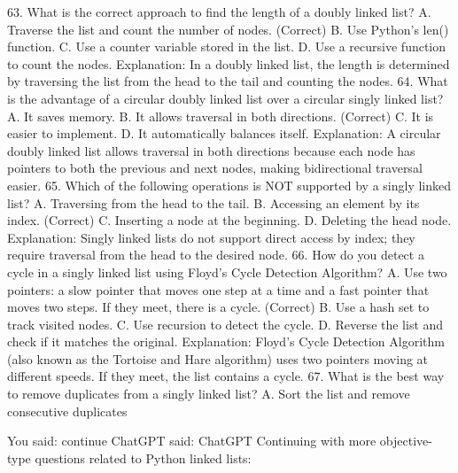 63. What is the correct approach to find the length of a doubly linked list?
A. Traverse the list and count the number of nodes. (Correct)
B. Use Python’s len() function.
C. Use a counter variable stored in the list.
D. Use a recursive function to count the nodes.
Explanation: In a doubly linked list, the length is determined by traversing the list from the head to the tail and counting the nodes.
64. What is the advantage of a circular doubly linked list over a circular singly linked list?
A. It saves memory.
B. It allows traversal in both directions. (Correct)
C. It is easier to implement.
D. It automatically balances itself.
Explanation: A circular doubly linked list allows traversal in both directions because each node has pointers to both the previous and next nodes, making bidirectional traversal easier.
65. Which of the following operations is NOT supported by a singly linked list?
A. Traversing from the head to the tail.
B. Accessing an element by its index. (Correct)
C. Inserting a node at the beginning.
D. Deleting the head node.
Explanation: Singly linked lists do not support direct access by index; they require traversal from the head to the desired node.
66. How do you detect a cycle in a singly linked list using Floyd’s Cycle Detection Algorithm?
A. Use two pointers: a slow pointer that moves one step at a time and a fast pointer that moves two steps. If they meet, there is a cycle. (Correct)
B. Use a hash set to track visited nodes.
C. Use recursion to detect the cycle.
D. Reverse the list and check if it matches the original.
Explanation: Floyd’s Cycle Detection Algorithm (also known as the Tortoise and Hare algorithm) uses two pointers moving at different speeds. If they meet, the list contains a cycle.
67. What is the best way to remove duplicates from a singly linked list?
A. Sort the list and remove consecutive duplicates





You said:
continue
ChatGPT said:
ChatGPT
Continuing with more objective-type questions related to Python linked lists:

